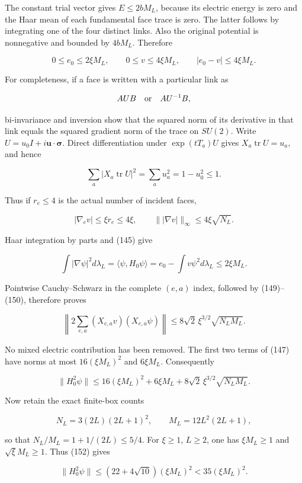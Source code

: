 \documentclass[
  11pt,
]{article}
\begin{document}
The constant trial vector gives \(E\le2bM_L\), because its electric
energy is zero and the Haar mean of each fundamental face trace is zero.
The latter follows by integrating one of the four distinct links. Also
the original potential is nonnegative and bounded by \(4bM_L\).
Therefore

\[
 0\le e_0\le2\xi M_L,\qquad
 0\le v\le4\xi M_L,\qquad
 |e_0-v|\le4\xi M_L.
\tag{148}
\]

For completeness, if a face is written with a particular link as

\[
 AUB\quad\hbox{or}\quad AU^{-1}B,
\]

bi-invariance and inversion show that the squared norm of its derivative
in that link equals the squared gradient norm of the trace on \(SU(2)\).
Write \(U=u_0I+i\mathbf u\cdot\boldsymbol\sigma\). Direct
differentiation under \(\exp(tT_a)U\) gives
\(X_a\operatorname{tr}U=u_a\), and hence

\[
 \sum_a|X_a\operatorname{tr}U|^2
 =\sum_au_a^2=1-u_0^2\le1.
\]

Thus if \(r_e\le4\) is the actual number of incident faces,

\[
 |\nabla_ev|\le\xi r_e\le4\xi,
 \qquad \||\nabla v|\|_\infty\le4\xi\sqrt{N_L}.
\tag{149}
\]

Haar integration by parts and (145) give

\[
 \int|\nabla\psi|^2d\lambda_L
 =\langle\psi,H_0\psi\rangle
 =e_0-\int v\psi^2d\lambda_L
 \le2\xi M_L.
\tag{150}
\]

Pointwise Cauchy--Schwarz in the complete \((e,a)\) index, followed by
(149)--(150), therefore proves

\[
 \left\|2\sum_{e,a}(X_{e,a}v)(X_{e,a}\psi)\right\|
 \le8\sqrt2\,\xi^{3/2}\sqrt{N_LM_L}.
\tag{151}
\]

No mixed electric contribution has been removed. The first two terms of
(147) have norms at most \(16(\xi M_L)^2\) and \(6\xi M_L\).
Consequently

\[
 \|H_0^2\psi\|
 \le16(\xi M_L)^2+6\xi M_L
      +8\sqrt2\,\xi^{3/2}\sqrt{N_LM_L}.
\tag{152}
\]

Now retain the exact finite-box counts

\[
 N_L=3(2L)(2L+1)^2,\qquad M_L=12L^2(2L+1),
\]

so that \(N_L/M_L=1+1/(2L)\le5/4\). For \(\xi\ge1\), \(L\ge2\), one has
\(\xi M_L\ge1\) and \(\sqrt\xi M_L\ge1\). Thus (152) gives

\[
 \boxed{
 \|H_0^2\psi\|
 \le(22+4\sqrt{10})(\xi M_L)^2
 <35(\xi M_L)^2.}
\tag{153}
\]
\end{document}
